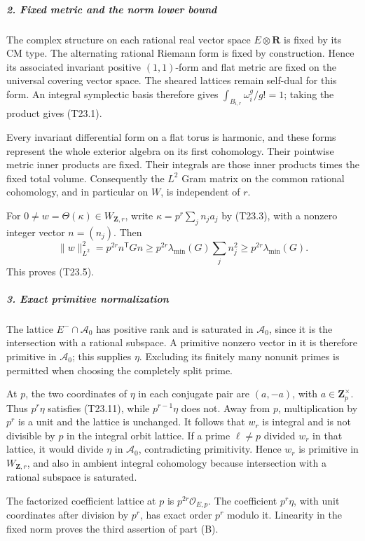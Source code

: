 \documentclass[11pt,a4paper]{article}
\theoremstyle{definition}
\begin{document}
\subparagraph{2. Fixed metric and the norm lower bound}\label{fixed-metric-and-the-norm-lower-bound}

The complex structure on each rational real vector space \(E\otimes\mathbf R\) is fixed by its CM type. The alternating rational Riemann form is fixed by construction. Hence its associated invariant positive \((1,1)\)-form and flat metric are fixed on the universal covering vector space. The sheared lattices remain self-dual for this form. An integral symplectic basis therefore gives \(\int_{B_{i,r}}\omega_i^g/g!=1\); taking the product gives (T23.1).

Every invariant differential form on a flat torus is harmonic, and these forms represent the whole exterior algebra on its first cohomology. Their pointwise metric inner products are fixed. Their integrals are those inner products times the fixed total volume. Consequently the \(L^2\) Gram matrix on the common rational cohomology, and in particular on \(W\), is independent of \(r\).

For \(0\ne w=\Theta(\kappa)\in W_{\mathbf Z,r}\), write \(\kappa=p^r\sum_j n_ja_j\) by (T23.3), with a nonzero integer vector \(n=(n_j)\). Then \[
 \|w\|_{L^2}^2
   =p^{2r}n^{\mathsf T}Gn
   \ge p^{2r}\lambda_{\min}(G)\sum_j n_j^2
   \ge p^{2r}\lambda_{\min}(G).
\] This proves (T23.5).

\subparagraph{3. Exact primitive normalization}\label{exact-primitive-normalization}

The lattice \(E^-\cap\mathcal A_0\) has positive rank and is saturated in \(\mathcal A_0\), since it is the intersection with a rational subspace. A primitive nonzero vector in it is therefore primitive in \(\mathcal A_0\); this supplies \(\eta\). Excluding its finitely many nonunit primes is permitted when choosing the completely split prime.

At \(p\), the two coordinates of \(\eta\) in each conjugate pair are \((a,-a)\), with \(a\in\mathbf Z_p^\times\). Thus \(p^r\eta\) satisfies (T23.11), while \(p^{r-1}\eta\) does not. Away from \(p\), multiplication by \(p^r\) is a unit and the lattice is unchanged. It follows that \(w_r\) is integral and is not divisible by \(p\) in the integral orbit lattice. If a prime \(\ell\ne p\) divided \(w_r\) in that lattice, it would divide \(\eta\) in \(\mathcal A_0\), contradicting primitivity. Hence \(w_r\) is primitive in \(W_{\mathbf Z,r}\), and also in ambient integral cohomology because intersection with a rational subspace is saturated.

The factorized coefficient lattice at \(p\) is \(p^{2r}\mathcal O_{E,p}\). The coefficient \(p^r\eta\), with unit coordinates after division by \(p^r\), has exact order \(p^r\) modulo it. Linearity in the fixed norm proves the third assertion of part (B).
\end{document}
